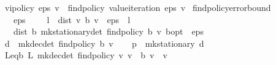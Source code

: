 \begin{isabellebody}
\isanewline
{}\isamarkupfalse%
\ {\isachardoublequoteopen}vi{\isacharunderscore}{\kern0pt}policy{\isacharprime}{\kern0pt}\ eps\ v\ {\isacharequal}{\kern0pt}\ find{\isacharunderscore}{\kern0pt}policy{\isacharprime}{\kern0pt}\ {\isacharparenleft}{\kern0pt}value{\isacharunderscore}{\kern0pt}iteration\ eps\ v{\isacharparenright}{\kern0pt}{\isachardoublequoteclose}\isanewline
\isanewline
{}\isamarkupfalse%
\ find{\isacharunderscore}{\kern0pt}policy{\isacharprime}{\kern0pt}{\isacharunderscore}{\kern0pt}error{\isacharunderscore}{\kern0pt}bound{\isacharcolon}{\kern0pt}\isanewline
\ \ \ {\isachardoublequoteopen}eps\ {\isachargreater}{\kern0pt}\ {}{\isachardoublequoteclose}\ {\isachardoublequoteopen}{}\ {\isacharasterisk}{\kern0pt}\ l\ {\isacharasterisk}{\kern0pt}\ dist\ v\ {\isacharparenleft}{\kern0pt}{\isasymL}\isactrlsub b\ v{\isacharparenright}{\kern0pt}\ {\isacharless}{\kern0pt}\ eps\ {\isacharasterisk}{\kern0pt}\ {\isacharparenleft}{\kern0pt}{}{\isacharminus}{\kern0pt}l{\isacharparenright}{\kern0pt}{\isachardoublequoteclose}\isanewline
\ \ \ {\isachardoublequoteopen}dist\ {\isacharparenleft}{\kern0pt}{\isasymnu}\isactrlsub b\ {\isacharparenleft}{\kern0pt}mk{\isacharunderscore}{\kern0pt}stationary{\isacharunderscore}{\kern0pt}det\ {\isacharparenleft}{\kern0pt}find{\isacharunderscore}{\kern0pt}policy{\isacharprime}{\kern0pt}\ {\isacharparenleft}{\kern0pt}{\isasymL}\isactrlsub b\ v{\isacharparenright}{\kern0pt}{\isacharparenright}{\kern0pt}{\isacharparenright}{\kern0pt}{\isacharparenright}{\kern0pt}\ {\isasymnu}\isactrlsub b{\isacharunderscore}{\kern0pt}opt\ {\isacharless}{\kern0pt}\ eps{\isachardoublequoteclose}\isanewline
%
\isadelimproof
%
\endisadelimproof
%
\isatagproof
{}\isamarkupfalse%
\ {\isacharminus}{\kern0pt}\isanewline
\ \ \isamarkupfalse%
\ {\isacharquery}{\kern0pt}d\ {\isacharequal}{\kern0pt}\ {\isachardoublequoteopen}mk{\isacharunderscore}{\kern0pt}dec{\isacharunderscore}{\kern0pt}det\ {\isacharparenleft}{\kern0pt}find{\isacharunderscore}{\kern0pt}policy{\isacharprime}{\kern0pt}\ {\isacharparenleft}{\kern0pt}{\isasymL}\isactrlsub b\ v{\isacharparenright}{\kern0pt}{\isacharparenright}{\kern0pt}{\isachardoublequoteclose}\isanewline
\ \ \isamarkupfalse%
\ {\isacharquery}{\kern0pt}p\ {\isacharequal}{\kern0pt}\ {\isachardoublequoteopen}mk{\isacharunderscore}{\kern0pt}stationary\ {\isacharquery}{\kern0pt}d{\isachardoublequoteclose}\isanewline
\ \ \isamarkupfalse%
\ L{\isacharunderscore}{\kern0pt}eq{\isacharunderscore}{\kern0pt}{\isasymL}\isactrlsub b{\isacharcolon}{\kern0pt}\ {\isachardoublequoteopen}L\ {\isacharparenleft}{\kern0pt}mk{\isacharunderscore}{\kern0pt}dec{\isacharunderscore}{\kern0pt}det\ {\isacharparenleft}{\kern0pt}find{\isacharunderscore}{\kern0pt}policy{\isacharprime}{\kern0pt}\ v{\isacharparenright}{\kern0pt}{\isacharparenright}{\kern0pt}\ v\ {\isacharequal}{\kern0pt}\ {\isasymL}\isactrlsub b\ v{\isachardoublequoteclose}\ \ v\isanewline

\end{isabellebody}
